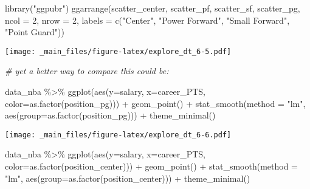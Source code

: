 \documentclass[
]{book}
\newenvironment{Shaded}{\begin{snugshade}}{\end{snugshade}}
\newcommand{\AttributeTok}[1]{\textcolor[rgb]{0.77,0.63,0.00}{#1}}
\newcommand{\AttributeTok}[1]{\textcolor[rgb]{0.13,0.29,0.53}{#1}}
\newcommand{\CommentTok}[1]{\textcolor[rgb]{0.56,0.35,0.01}{\textit{#1}}}
\newcommand{\DecValTok}[1]{\textcolor[rgb]{0.00,0.00,0.81}{#1}}
\newcommand{\FunctionTok}[1]{\textcolor[rgb]{0.00,0.00,0.00}{#1}}
\newcommand{\FunctionTok}[1]{\textcolor[rgb]{0.13,0.29,0.53}{\textbf{#1}}}
\newcommand{\NormalTok}[1]{#1}
\newcommand{\SpecialCharTok}[1]{\textcolor[rgb]{0.00,0.00,0.00}{#1}}
\newcommand{\SpecialCharTok}[1]{\textcolor[rgb]{0.81,0.36,0.00}{\textbf{#1}}}
\newcommand{\StringTok}[1]{\textcolor[rgb]{0.31,0.60,0.02}{#1}}
\begin{document}
\begin{Shaded}
\begin{Highlighting}[]
\FunctionTok{library}\NormalTok{(}\StringTok{"ggpubr"}\NormalTok{)}
\FunctionTok{ggarrange}\NormalTok{(scatter\_center, scatter\_pf,}
\NormalTok{          scatter\_sf, scatter\_pg,}
          \AttributeTok{ncol =} \DecValTok{2}\NormalTok{, }\AttributeTok{nrow =} \DecValTok{2}\NormalTok{,}
          \AttributeTok{labels =} \FunctionTok{c}\NormalTok{(}\StringTok{"Center"}\NormalTok{,}
                     \StringTok{"Power Forward"}\NormalTok{,}
                     \StringTok{"Small Forward"}\NormalTok{,}
                     \StringTok{"Point Guard"}\NormalTok{))}
\end{Highlighting}
\end{Shaded}

\texttt{[image: \_main\_files/figure-latex/explore\_dt\_6-5.pdf]}

\begin{Shaded}
\begin{Highlighting}[]
\CommentTok{\# yet a better way to compare this could be:}

\NormalTok{data\_nba }\SpecialCharTok{\%\textgreater{}\%} 
  \FunctionTok{ggplot}\NormalTok{(}\FunctionTok{aes}\NormalTok{(}\AttributeTok{y=}\NormalTok{salary, }\AttributeTok{x=}\NormalTok{career\_PTS, }\AttributeTok{color=}\FunctionTok{as.factor}\NormalTok{(position\_pg))) }\SpecialCharTok{+}
    \FunctionTok{geom\_point}\NormalTok{() }\SpecialCharTok{+} 
     \FunctionTok{stat\_smooth}\NormalTok{(}\AttributeTok{method =} \StringTok{"lm"}\NormalTok{,}
                 \FunctionTok{aes}\NormalTok{(}\AttributeTok{group=}\FunctionTok{as.factor}\NormalTok{(position\_pg))) }\SpecialCharTok{+} 
       \FunctionTok{theme\_minimal}\NormalTok{()}
\end{Highlighting}
\end{Shaded}

\texttt{[image: \_main\_files/figure-latex/explore\_dt\_6-6.pdf]}

\begin{Shaded}
\begin{Highlighting}[]
\NormalTok{data\_nba }\SpecialCharTok{\%\textgreater{}\%} 
  \FunctionTok{ggplot}\NormalTok{(}\FunctionTok{aes}\NormalTok{(}\AttributeTok{y=}\NormalTok{salary, }\AttributeTok{x=}\NormalTok{career\_PTS, }\AttributeTok{color=}\FunctionTok{as.factor}\NormalTok{(position\_center))) }\SpecialCharTok{+}
    \FunctionTok{geom\_point}\NormalTok{() }\SpecialCharTok{+} 
     \FunctionTok{stat\_smooth}\NormalTok{(}\AttributeTok{method =} \StringTok{"lm"}\NormalTok{,}
                 \FunctionTok{aes}\NormalTok{(}\AttributeTok{group=}\FunctionTok{as.factor}\NormalTok{(position\_center))) }\SpecialCharTok{+} 
       \FunctionTok{theme\_minimal}\NormalTok{()}
\end{Highlighting}
\end{Shaded}
\end{document}
